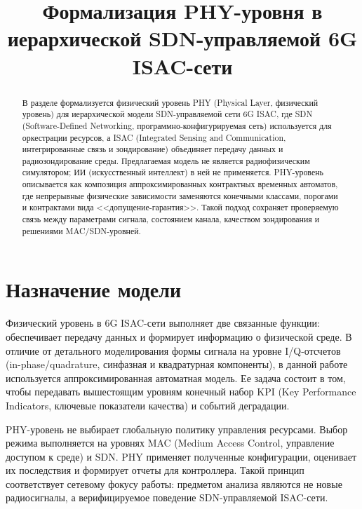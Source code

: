 \documentclass[12pt,a4paper]{article}
\title{Формализация PHY-уровня в иерархической SDN-управляемой 6G ISAC-сети}
\author{}
\date{}
\begin{document}
\maketitle

\begin{abstract}
В разделе формализуется физический уровень PHY (Physical Layer, физический уровень) для иерархической модели SDN-управляемой сети 6G ISAC, где SDN (Software-Defined Networking, программно-конфигурируемая сеть) используется для оркестрации ресурсов, а ISAC (Integrated Sensing and Communication, интегрированные связь и зондирование) объединяет передачу данных и радиозондирование среды. Предлагаемая модель не является радиофизическим симулятором; ИИ (искусственный интеллект) в ней не применяется. PHY-уровень описывается как композиция аппроксимированных контрактных временных автоматов, где непрерывные физические зависимости заменяются конечными классами, порогами и контрактами вида <<допущение-гарантия>>. Такой подход сохраняет проверяемую связь между параметрами сигнала, состоянием канала, качеством зондирования и решениями MAC/SDN-уровней.
\end{abstract}

\section{Назначение модели}

Физический уровень в 6G ISAC-сети выполняет две связанные функции: обеспечивает передачу данных и формирует информацию о физической среде. В отличие от детального моделирования формы сигнала на уровне I/Q-отсчетов (in-phase/quadrature, синфазная и квадратурная компоненты), в данной работе используется аппроксимированная автоматная модель. Ее задача состоит в том, чтобы передавать вышестоящим уровням конечный набор KPI (Key Performance Indicators, ключевые показатели качества) и событий деградации.

PHY-уровень не выбирает глобальную политику управления ресурсами. Выбор режима выполняется на уровнях MAC (Medium Access Control, управление доступом к среде) и SDN. PHY применяет полученные конфигурации, оценивает их последствия и формирует отчеты для контроллера. Такой принцип соответствует сетевому фокусу работы: предметом анализа являются не новые радиосигналы, а верифицируемое поведение SDN-управляемой ISAC-сети.
\end{document}

